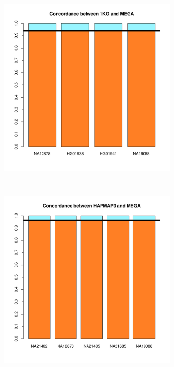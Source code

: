 \documentclass[11pt]{report}
\begin{document}
\begin{figure}[ht]
    \centering
    \caption{Comparacion sin cluster}
    \begin{subfigure}[t]{0.5\textwidth}
        \centering
        \includegraphics[scale=0.55]{Concordance_1KG_MEGA_nocluster.pdf}
    \end{subfigure}%
    ~ 
    \begin{subfigure}[t]{0.5\textwidth}
        \centering
        \includegraphics[scale=0.55]{Concordance_HAPMAP_MEGA_nocluster.pdf}
	 \end{subfigure}
\end{figure}
\end{document}
